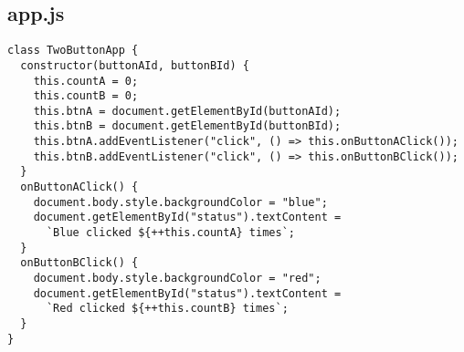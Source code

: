 \subsection{app.js}
\begin{verbatim}
class TwoButtonApp {
  constructor(buttonAId, buttonBId) {
    this.countA = 0;
    this.countB = 0;
    this.btnA = document.getElementById(buttonAId);
    this.btnB = document.getElementById(buttonBId);
    this.btnA.addEventListener("click", () => this.onButtonAClick());
    this.btnB.addEventListener("click", () => this.onButtonBClick());
  }
  onButtonAClick() {
    document.body.style.backgroundColor = "blue";
    document.getElementById("status").textContent =
      `Blue clicked ${++this.countA} times`;
  }
  onButtonBClick() {
    document.body.style.backgroundColor = "red";
    document.getElementById("status").textContent =
      `Red clicked ${++this.countB} times`;
  }
}
\end{verbatim}

